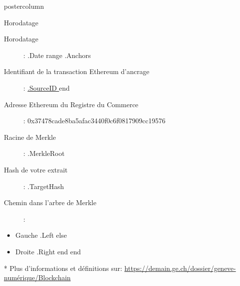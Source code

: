 \documentclass[roundedcorners=true, titleposition=center]{beamerthemeruhuisstijlposter}
\begin{document}
\begin{frame}
\begin{columns}
\begin{column}{0.95\textwidth}
\begin{beamercolorbox}[center, wd=\textwidth]{postercolumn}
\begin{minipage}[T]{0.95\textwidth}
    \hfill
\parbox[t][\columnheight]{\textwidth}{%

\begin{block}{Horodatage}
\begin{description}
\item [Horodatage] :\linebreak
{{ .Date }}
{{ range .Anchors }}
\item [Identifiant de la transaction Ethereum d’ancrage] :\linebreak
\href{https://etherscan.io/tx/{{ .SourceID }} }{ {{.SourceID }} }
{{ end }}
\item[Adresse Ethereum du Registre du Commerce] :\linebreak
0x37478cade8ba5afac3440f0c6f0817909cc19576
\item[Racine de Merkle] :\linebreak
{{ .MerkleRoot }}
\item[Hash de votre extrait] :\linebreak
{{ .TargetHash }}
\item[Chemin dans l’arbre de Merkle] :
\end{description}
\begin{itemize}
{{ range .Proof }}
    {{ if .Left }}
        \item Gauche {{ .Left }}
    {{ else }}
        \item Droite {{ .Right }}
    {{ end }}
{{ end }}
\end{itemize}
\end{block}

* Plus d'informations et définitions sur: \url{https://demain.ge.ch/dossier/geneve-numérique/Blockchain}
}
\end{minipage}
\end{beamercolorbox}
\end{column}
\end{columns}
\end{frame}
\end{document}
